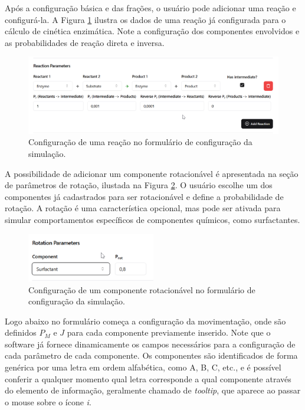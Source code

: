 \documentclass[12pt,oneside]{report}
\begin{document}
Após a configuração básica e das frações, o usuário pode adicionar uma reação e configurá-la. A Figura \ref{fig:interface_reacao} ilustra os dados de uma reação já configurada para o cálculo de cinética enzimática. Note a configuração dos componentes envolvidos e as probabilidades de reação direta e inversa.

\begin{figure}[H]
    \centering
    \includegraphics[width=1\textwidth]{reacao_config.png}
    \caption{\small Configuração de uma reação no formulário de configuração da simulação.}
    \label{fig:interface_reacao}
\end{figure}

A possibilidade de adicionar um componente rotacionável é apresentada na seção de parâmetros de rotação, ilustada na Figura \ref{fig:interface_rotacao}. O usuário escolhe um dos componentes já cadastrados para ser rotacionável e define a probabilidade de rotação. A rotação é uma característica opcional, mas pode ser ativada para simular comportamentos específicos de componentes químicos, como surfactantes.

\begin{figure}[H]
    \centering
    \includegraphics[width=0.5\textwidth]{rotacao_config.png}
    \caption{\small Configuração de um componente rotacionável no formulário de configuração da simulação.}
    \label{fig:interface_rotacao}
\end{figure}

Logo abaixo no formulário começa a configuração da movimentação, onde são definidos $P_M$ e $J$ para cada componente previamente inserido. Note que o software já fornece dinamicamente os campos necessários para a configuração de cada parâmetro de cada componente. Os componentes são identificados de forma genérica por uma letra em ordem alfabética, como A, B, C, etc., e é possível conferir a qualquer momento qual letra corresponde a qual componente através do elemento de informação, geralmente chamado de \textit{tooltip}, que aparece ao passar o mouse sobre o ícone \textit{i}.
\end{document}
